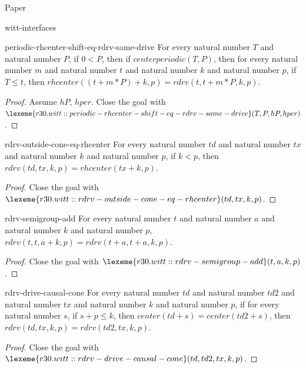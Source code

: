 \begin{lexlean}{Paper}
\begin{section}{witt-interfaces}
  \begin{theorem}{periodic-rhcenter-shift-eq-rdrv-same-drive}
  For every natural number \(T\) and natural number \(P\), if \(0 < P\), then if \(centerperiodic(T, P)\), then for every natural number \(m\) and natural number \(t\) and natural number \(k\) and natural number \(p\), if \(T ≤ t\), then \(rhcenter((t + m * P) + k, p) = rdrv(t, t + m * P, k, p)\).
  \begin{proof}
  Assume \(hP\), \(hper\).
  Close the goal with \(\lexeme{r30.witt::periodic-rhcenter-shift-eq-rdrv-same-drive}(T, P, hP, hper)\).
  \end{proof}
  \end{theorem}

  \begin{theorem}{rdrv-outside-cone-eq-rhcenter}
  For every natural number \(td\) and natural number \(tx\) and natural number \(k\) and natural number \(p\), if \(k < p\), then \(rdrv(td, tx, k, p) = rhcenter(tx + k, p)\).
  \begin{proof}
  Close the goal with \(\lexeme{r30.witt::rdrv-outside-cone-eq-rhcenter}(td, tx, k, p)\).
  \end{proof}
  \end{theorem}

  \begin{theorem}{rdrv-semigroup-add}
  For every natural number \(t\) and natural number \(a\) and natural number \(k\) and natural number \(p\), \(rdrv(t, t, a + k, p) = rdrv(t + a, t + a, k, p)\).
  \begin{proof}
  Close the goal with \(\lexeme{r30.witt::rdrv-semigroup-add}(t, a, k, p)\).
  \end{proof}
  \end{theorem}

  \begin{theorem}{rdrv-drive-causal-cone}
  For every natural number \(td\) and natural number \(td2\) and natural number \(tx\) and natural number \(k\) and natural number \(p\), if for every natural number \(s\), if \(s + p ≤ k\), then \(center(td + s) = center(td2 + s)\), then \(rdrv(td, tx, k, p) = rdrv(td2, tx, k, p)\).
  \begin{proof}
  Close the goal with \(\lexeme{r30.witt::rdrv-drive-causal-cone}(td, td2, tx, k, p)\).
  \end{proof}
  \end{theorem}


\end{section}
\end{lexlean}
